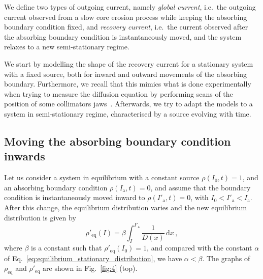 We define two types of outgoing current, namely \textsl{global current}, i.e.\ the outgoing current observed from a slow core erosion process while keeping the absorbing boundary condition fixed, and \textsl{recovery current}, i.e.\ the current observed after the absorbing boundary condition is instantaneously moved, and the system relaxes to a new semi-stationary regime.

We start by modelling the shape of the recovery current for a stationary system with a fixed source, both for inward and outward movements of the absorbing boundary. Furthermore, we recall that this mimics what is done experimentally when trying to measure the diffusion equation by performing scans of the position of some collimators jaws~{\cite{MESS1994279,flilleriii:pac03-rpag004,stancari2011diffusion,stancari:ipac11-tupz033,Stancari:1637929,PhysRevSTAB.16.021003,PhysRevAccelBeams.23.044802}}. Afterwards, we try to adapt the models to a system in semi-stationary regime, characterised by a source evolving with time.


\subsection{Moving the absorbing boundary condition inwards}


Let us consider a system in equilibrium with a constant  source $\rho(I_0, t)=1$, and an absorbing boundary condition $\rho(I_\mathrm{a}, t)=0$, and assume that the boundary condition is instantaneously moved inward to $\rho(I'_\mathrm{a}, t)=0$, with $I_0 < I'_\mathrm{a} < I_\mathrm{a}$. After this change, the equilibrium distribution varies and the new equilibrium distribution is given by
\begin{equation}
    \rho'_\text{eq}(I) = \beta \int_I^{I'_\mathrm{a}} \frac{1}{D(x)}\,\mathrm{d}x\,,
\end{equation}
where $\beta$ is a constant such that $\rho'_\text{eq}(I_0)=1$, and compared with the constant $\alpha$ of Eq.~\eqref{eq:equilibrium_stationary_distribution}, we have $\alpha < \beta$. The graphs of $\rho_\mathrm{eq}$ and $\rho'_\mathrm{eq}$ are shown in Fig.~\ref{fig:4} (top).

